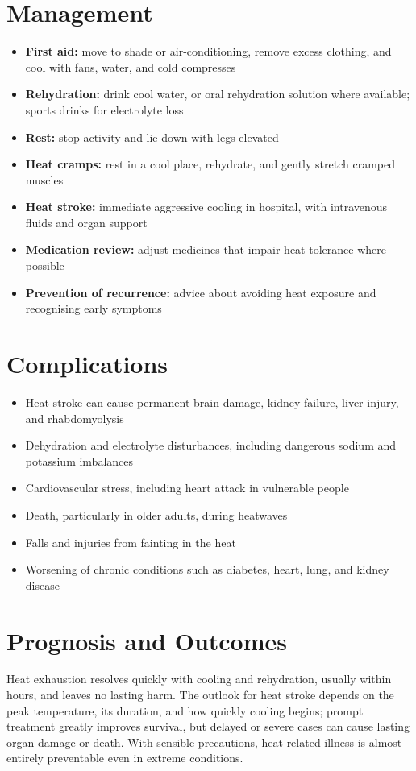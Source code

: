 \section*{Management}
\begin{itemize}
    \item \textbf{First aid:} move to shade or air-conditioning, remove excess clothing, and cool with fans, water, and cold compresses
    \item \textbf{Rehydration:} drink cool water, or oral rehydration solution where available; sports drinks for electrolyte loss
    \item \textbf{Rest:} stop activity and lie down with legs elevated
    \item \textbf{Heat cramps:} rest in a cool place, rehydrate, and gently stretch cramped muscles
    \item \textbf{Heat stroke:} immediate aggressive cooling in hospital, with intravenous fluids and organ support
    \item \textbf{Medication review:} adjust medicines that impair heat tolerance where possible
    \item \textbf{Prevention of recurrence:} advice about avoiding heat exposure and recognising early symptoms
\end{itemize}

\section*{Complications}
\begin{itemize}
    \item Heat stroke can cause permanent brain damage, kidney failure, liver injury, and rhabdomyolysis
    \item Dehydration and electrolyte disturbances, including dangerous sodium and potassium imbalances
    \item Cardiovascular stress, including heart attack in vulnerable people
    \item Death, particularly in older adults, during heatwaves
    \item Falls and injuries from fainting in the heat
    \item Worsening of chronic conditions such as diabetes, heart, lung, and kidney disease
\end{itemize}

\section*{Prognosis and Outcomes}
Heat exhaustion resolves quickly with cooling and rehydration, usually within hours, and leaves no lasting harm. The outlook for heat stroke depends on the peak temperature, its duration, and how quickly cooling begins; prompt treatment greatly improves survival, but delayed or severe cases can cause lasting organ damage or death. With sensible precautions, heat-related illness is almost entirely preventable even in extreme conditions.

